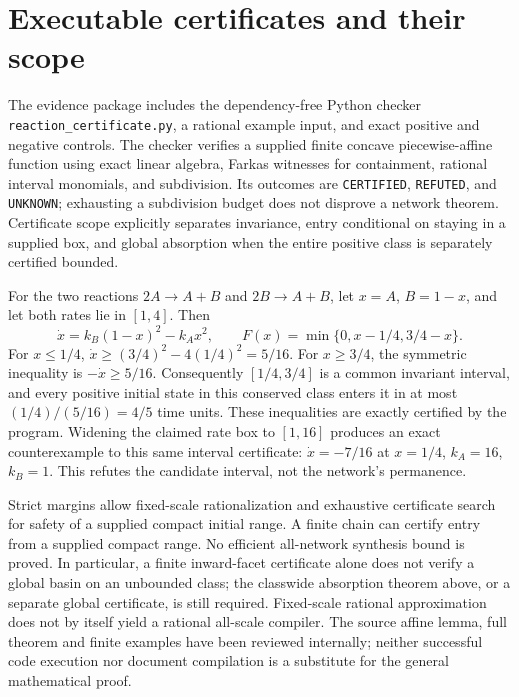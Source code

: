 \section{Executable certificates and their scope}
The evidence package includes the dependency-free Python checker
\texttt{reaction\_certificate.py}, a rational example input, and exact
positive and negative controls. The checker verifies a supplied finite
concave piecewise-affine function using exact linear algebra, Farkas
witnesses for containment, rational interval monomials, and subdivision.
Its outcomes are \texttt{CERTIFIED}, \texttt{REFUTED}, and
\texttt{UNKNOWN}; exhausting a subdivision budget does not disprove a
network theorem. Certificate scope explicitly separates invariance,
entry conditional on staying in a supplied box, and global absorption
when the entire positive class is separately certified bounded.

For the two reactions $2A\to A+B$ and $2B\to A+B$, let $x=A$,
$B=1-x$, and let both rates lie in $[1,4]$. Then
\[
 \dot x=k_B(1-x)^2-k_Ax^2,\qquad
 F(x)=\min\{0,x-1/4,3/4-x\}.
\]
For $x\le1/4$, $\dot x\ge(3/4)^2-4(1/4)^2=5/16$.
For $x\ge3/4$, the symmetric inequality is $-\dot x\ge5/16$.
Consequently $[1/4,3/4]$ is a common invariant interval, and every
positive initial state in this conserved class enters it in at most
$(1/4)/(5/16)=4/5$ time units. These inequalities are exactly certified
by the program. Widening the claimed rate box to $[1,16]$ produces
an exact counterexample to this same interval certificate:
$\dot x=-7/16$ at $x=1/4$, $k_A=16$, $k_B=1$.
This refutes the candidate interval, not the network's permanence.

Strict margins allow fixed-scale rationalization and exhaustive
certificate search for safety of a supplied compact initial range.
A finite chain can certify entry from a supplied compact range.
No efficient all-network synthesis bound is proved. In particular,
a finite inward-facet certificate alone does not verify a global basin
on an unbounded class; the classwide absorption theorem above, or a
separate global certificate, is still required. Fixed-scale rational
approximation does not by itself yield a rational all-scale compiler.
The source affine lemma, full theorem and finite examples have been
reviewed internally; neither successful code execution nor document
compilation is a substitute for the general mathematical proof.

